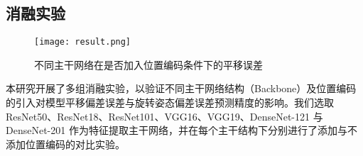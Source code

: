 \subsection{消融实验}
\begin{table}[htbp]
	\caption[不同主干网络结构与位置编码对模型预测平移与旋转误差精度的影响]{不同主干网络结构与位置编码对模型预测平移与旋转误差精度的影响}
	\label{tab:effective_r_6}
	
\end{table}
\begin{figure}[H]
	\texttt{[image: result.png]}
	\caption[不同主干网络在是否加入位置编码条件H下的平移误差]{不同主干网络在是否加入位置编码条件下的平移误差} %
	\label{fig:effective_r_5}
\end{figure}
本研究开展了多组消融实验，以验证不同主干网络结构（Backbone）及位置编码的引入对模型平移偏差误差与旋转姿态偏差误差预测精度的影响。我们选取 ResNet50、ResNet18、ResNet101、VGG16、VGG19、DenseNet-121 与 DenseNet-201 作为特征提取主干网络，并在每个主干结构下分别进行了添加与不添加位置编码的对比实验。

